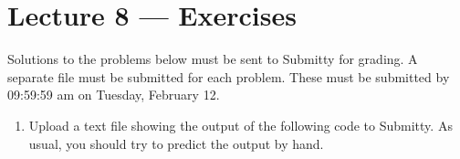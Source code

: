 \documentclass[letterpaper,10pt,english]{sphinxmanual}
\begin{document}
\chapter{Lecture 8 — Exercises}
\label{\detokenize{lecture_notes/lec08_lists1_exercises/exercises:lecture-8-exercises}}\label{\detokenize{lecture_notes/lec08_lists1_exercises/exercises::doc}}
Solutions to the problems below must be sent to Submitty for grading.
A separate file must be submitted for each problem. These must be
submitted by 09:59:59 am on Tuesday, February 12.
\begin{enumerate}
\def\theenumi{\arabic{enumi}}
\def\labelenumi{\theenumi .}
\makeatletter\def\p@enumii{\p@enumi \theenumi .}\makeatother
\item {} 
Upload a text file showing the output of the following code to
Submitty. As usual, you should try to predict the output by hand.

\begin{sphinxVerbatim}[commandchars=\\\{\}]
  \PYG{p}{[}   \PYG{p}{]}
\PYG{p}{[}\PYG{p}{]} \PYG{p}{[}\PYG{p}{]}
 
\PYG{p}{[}\PYG{p}{]}
 \PYG{p}{[} \PYG{p}{]}
\PYG{p}{[}\PYG{p}{]}  \PYG{p}{[}\PYG{p}{]}
\PYG{p}{[}\PYG{p}{]}  \PYG{p}{[}\PYG{p}{]}\PYG{p}{[}\PYG{p}{]}
\PYG{p}{[}\PYG{p}{]}
\PYG{p}{[}\PYG{p}{]}
\end{sphinxVerbatim}


\end{enumerate}
\end{document}

